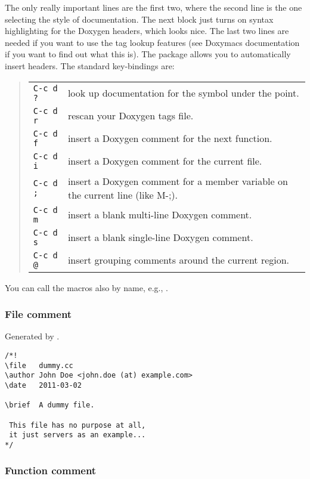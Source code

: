 The only really important lines are the first two, where the second
line is the one selecting the style of documentation. The next block
just turns on syntax highlighting for the Doxygen headers, which looks
nice. The last two lines are needed if you want to use the tag lookup
features (see Doxymacs documentation if you want to find out what this
is).  The package allows you to automatically insert headers. The
standard key-bindings are:
\begin{quote}
\begin{tabularx}{.8\hsize}{@{}lX}
\texttt{C-c d ?} & look up documentation for the symbol under the point.\\
\texttt{C-c d r} & rescan your Doxygen tags file.\\
\texttt{C-c d f} & insert a Doxygen comment for the next function.\\
\texttt{C-c d i} & insert a Doxygen comment for the current file.\\
\texttt{C-c d ;} & insert a Doxygen comment for a member variable on the current line (like M-;).\\
\texttt{C-c d m} & insert a blank multi-line Doxygen comment.\\
\texttt{C-c d s} & insert a blank single-line Doxygen comment.\\
\texttt{C-c d @} & insert grouping comments around the current region.\\
\end{tabularx}
\end{quote}
You can call the macros also by name, e.g., .

\subsubsection{File comment}

Generated by .

\begin{verbatim}
/*!
\file   dummy.cc
\author John Doe <john.doe (at) example.com>
\date   2011-03-02

\brief  A dummy file.

 This file has no purpose at all,
 it just servers as an example... 
*/
\end{verbatim}

\subsubsection{Function comment}

